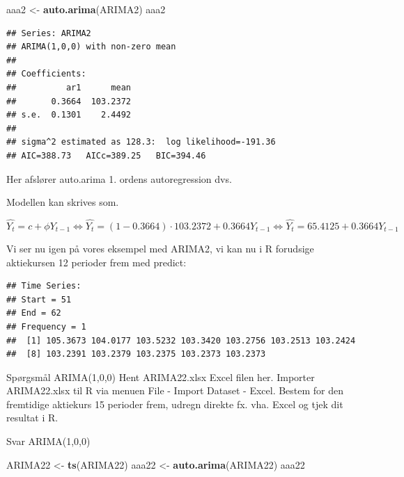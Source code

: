 \documentclass[]{book}
\newenvironment{Shaded}{\begin{snugshade}}{\end{snugshade}}
\newcommand{\DataTypeTok}[1]{\textcolor[rgb]{0.13,0.29,0.53}{#1}}
\newcommand{\DecValTok}[1]{\textcolor[rgb]{0.00,0.00,0.81}{#1}}
\newcommand{\KeywordTok}[1]{\textcolor[rgb]{0.13,0.29,0.53}{\textbf{#1}}}
\newcommand{\NormalTok}[1]{#1}
\newcommand{\OperatorTok}[1]{\textcolor[rgb]{0.81,0.36,0.00}{\textbf{#1}}}
\newcommand{\StringTok}[1]{\textcolor[rgb]{0.31,0.60,0.02}{#1}}
\begin{document}
\begin{Shaded}
\begin{Highlighting}[]
\NormalTok{aaa2 <-}\StringTok{ }\KeywordTok{auto.arima}\NormalTok{(ARIMA2)}
\NormalTok{aaa2}
\end{Highlighting}
\end{Shaded}

\begin{verbatim}
## Series: ARIMA2 
## ARIMA(1,0,0) with non-zero mean 
## 
## Coefficients:
##          ar1      mean
##       0.3664  103.2372
## s.e.  0.1301    2.4492
## 
## sigma^2 estimated as 128.3:  log likelihood=-191.36
## AIC=388.73   AICc=389.25   BIC=394.46
\end{verbatim}

Her afslører auto.arima 1. ordens autoregression dvs.

Modellen kan skrives som.

\[\hat{Y_t}=c + \phi Y_{t-1}\Leftrightarrow \hat{Y_t}=(1-0.3664)\cdot 103.2372 + 0.3664Y_{t-1}\Leftrightarrow \hat{Y_t}=65.4125 + 0.3664Y_{t-1}\]

Vi ser nu igen på vores eksempel med ARIMA2, vi kan nu i R forudsige aktiekursen 12 perioder frem med predict:

\begin{Shaded}
\end{Shaded}

\begin{verbatim}
## Time Series:
## Start = 51 
## End = 62 
## Frequency = 1 
##  [1] 105.3673 104.0177 103.5232 103.3420 103.2756 103.2513 103.2424
##  [8] 103.2391 103.2379 103.2375 103.2373 103.2373
\end{verbatim}

Spørgsmål ARIMA(1,0,0)
Hent ARIMA22.xlsx Excel filen her. Importer ARIMA22.xlsx til R via menuen File - Import Dataset - Excel. Bestem for den fremtidige aktiekurs 15 perioder frem, udregn direkte fx. vha. Excel og tjek dit resultat i R.

Svar ARIMA(1,0,0)

\begin{Shaded}
\begin{Highlighting}[]
\NormalTok{ARIMA22 <-}\StringTok{ }\KeywordTok{ts}\NormalTok{(ARIMA22)}
\NormalTok{aaa22 <-}\StringTok{ }\KeywordTok{auto.arima}\NormalTok{(ARIMA22)}
\NormalTok{aaa22}
\end{Highlighting}
\end{Shaded}
\end{document}
